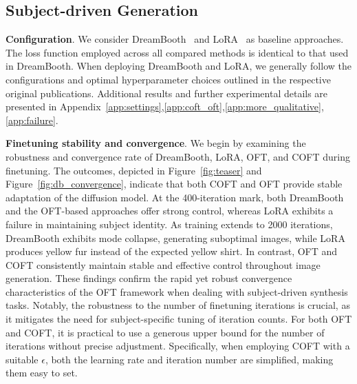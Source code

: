 \subsection{Subject-driven Generation}

\textbf{Configuration}. We consider DreamBooth~\cite{ruiz2023dreambooth} and LoRA~\cite{hulora2022} as baseline approaches. The loss function employed across all compared methods is identical to that used in DreamBooth. When deploying DreamBooth and LoRA, we generally follow the configurations and optimal hyperparameter choices outlined in the respective original publications. Additional results and further experimental details are presented in Appendix~\ref{app:settings},\ref{app:coft_oft},\ref{app:more_qualitative},\ref{app:failure}.

\textbf{Finetuning stability and convergence}. We begin by examining the robustness and convergence rate of DreamBooth, LoRA, OFT, and COFT during finetuning. The outcomes, depicted in Figure~\ref{fig:teaser} and Figure~\ref{fig:db_convergence}, indicate that both COFT and OFT provide stable adaptation of the diffusion model. At the 400-iteration mark, both DreamBooth and the OFT-based approaches offer strong control, whereas LoRA exhibits a failure in maintaining subject identity. As training extends to 2000 iterations, DreamBooth exhibits mode collapse, generating suboptimal images, while LoRA produces yellow fur instead of the expected yellow shirt. In contrast, OFT and COFT consistently maintain stable and effective control throughout image generation. These findings confirm the rapid yet robust convergence characteristics of the OFT framework when dealing with subject-driven synthesis tasks. Notably, the robustness to the number of finetuning iterations is crucial, as it mitigates the need for subject-specific tuning of iteration counts. For both OFT and COFT, it is practical to use a generous upper bound for the number of iterations without precise adjustment. Specifically, when employing COFT with a suitable $\epsilon$, both the learning rate and iteration number are simplified, making them easy to set.

